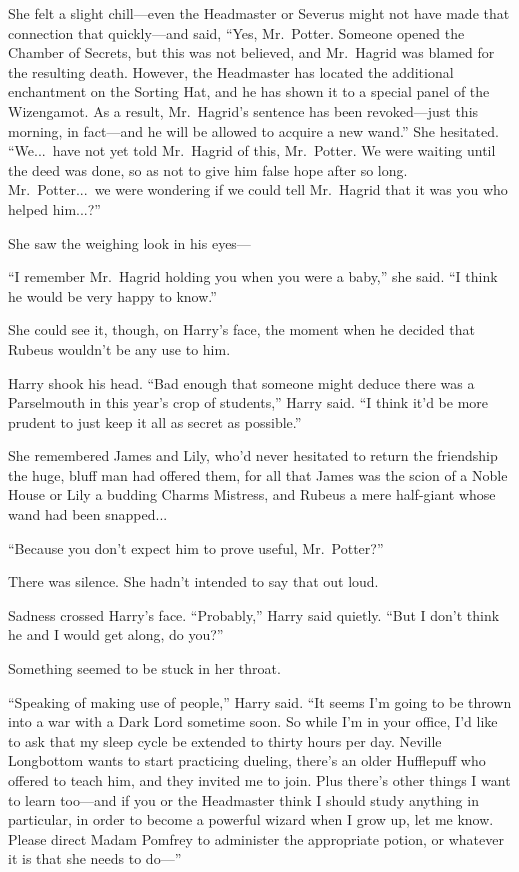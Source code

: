 She felt a slight chill—even the Headmaster or Severus might not have made that connection that quickly—and said, “Yes, Mr.~Potter. Someone opened the Chamber of Secrets, but this was not believed, and Mr.~Hagrid was blamed for the resulting death. However, the Headmaster has located the additional enchantment on the Sorting Hat, and he has shown it to a special panel of the Wizengamot. As a result, Mr.~Hagrid’s sentence has been revoked—just this morning, in fact—and he will be allowed to acquire a new wand.” She hesitated. “We...\ have not yet told Mr.~Hagrid of this, Mr.~Potter. We were waiting until the deed was done, so as not to give him false hope after so long. Mr.~Potter...\ we were wondering if we could tell Mr.~Hagrid that it was you who helped him...?”

She saw the weighing look in his eyes—

“I remember Mr.~Hagrid holding you when you were a baby,” she said. “I think he would be very happy to know.”

She could see it, though, on Harry’s face, the moment when he decided that Rubeus wouldn’t be any use to him.

Harry shook his head. “Bad enough that someone might deduce there was a Parselmouth in this year’s crop of students,” Harry said. “I think it’d be more prudent to just keep it all as secret as possible.”

She remembered James and Lily, who’d never hesitated to return the friendship the huge, bluff man had offered them, for all that James was the scion of a Noble House or Lily a budding Charms Mistress, and Rubeus a mere half-giant whose wand had been snapped...

“Because you don’t expect him to prove useful, Mr.~Potter?”

There was silence. She hadn’t intended to say that out loud.

Sadness crossed Harry’s face. “Probably,” Harry said quietly. “But I don’t think he and I would get along, do you?”

Something seemed to be stuck in her throat.

“Speaking of making use of people,” Harry said. “It seems I’m going to be thrown into a war with a Dark Lord sometime soon. So while I’m in your office, I’d like to ask that my sleep cycle be extended to thirty hours per day. Neville Longbottom wants to start practicing dueling, there’s an older Hufflepuff who offered to teach him, and they invited me to join. Plus there’s other things I want to learn too—and if you or the Headmaster think I should study anything in particular, in order to become a powerful wizard when I grow up, let me know. Please direct Madam Pomfrey to administer the appropriate potion, or whatever it is that she needs to do—”

